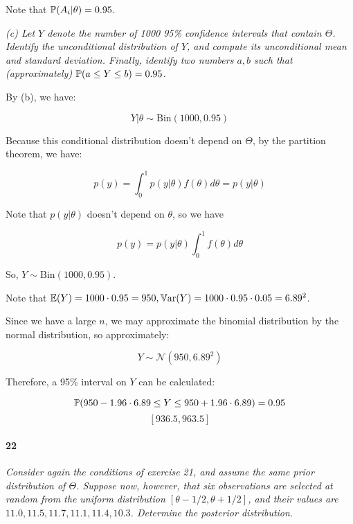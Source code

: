 \documentclass[a4paper]{article}
\begin{document}
                Note that $\mathbb{P}(A_i | \theta) = 0.95$.

            \textit{(c) Let $Y$ denote the number of 1000 95\% confidence
            intervals that contain $\Theta$. Identify the unconditional
            distribution of $Y$, and compute its unconditional mean and standard
            deviation. Finally, identify two numbers $a, b$ such that
            (approximately) $\mathbb{P}(a \leq Y \leq b) = 0.95$.}

                By (b), we have:

                \[
                    Y | \theta \sim \text{Bin}(1000, 0.95)
                \]

                Because this conditional distribution doesn't depend on
                $\Theta$, by the partition theorem, we have:

                \[
                    p(y) = \int_0^1 p(y | \theta) f(\theta) d\theta =
                    p(y | \theta)
                \]

                Note that $p(y | \theta)$ doesn't depend on $\theta$, so we have

                \[
                    p(y) = p(y | \theta) \int_0^1 f(\theta) d\theta
                \]

                So, $Y \sim \text{Bin}(1000, 0.95)$.

                Note that $\mathbb{E}(Y) = 1000 \cdot 0.95 = 950, \mathbb{V}\text{ar}(Y) = 1000 \cdot
                0.95 \cdot 0.05 = 6.89^2$.

                Since we have a large $n$, we may approximate the binomial
                distribution by the normal distribution, so approximately:

                \[
                    Y \sim \mathcal{N}(950, 6.89^2)
                \]

                Therefore, a 95\% interval on $Y$ can be calculated:

                \[
                    \mathbb{P}(950 - 1.96 \cdot 6.89 \leq Y \leq 950 + 1.96 \cdot
                    6.89) = 0.95
                \]
                \[
                    [936.5, 963.5]
                \]

            \paragraph{22}
            \textit{Consider again the conditions of exercise 21, and assume the
            same prior distribution of $\Theta$. Suppose now, however, that six
            observations are selected at random from the uniform distribution
            $[\theta - 1/2, \theta + 1/2]$, and their values are $11.0, 11.5,
            11.7, 11.1, 11.4, 10.3$. Determine the posterior distribution}.
\end{document}
